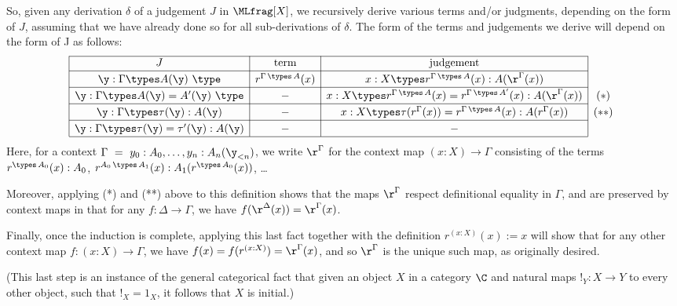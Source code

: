 So, given any derivation $\delta$ of a judgement $J$ in $\MLfrag[X]$, we recursively derive various terms and/or judgments, depending on the form of $J$, assuming that we have already done so for all sub-derivations of $\delta$.  The form of the terms and judgements we derive will depend on the form of J as follows:\medskip
\[\begin{array}{|c|c|c|c}
\cline{1-3} \rule[-1ex]{0ex}{3.1ex}
J & \textrm{term} & \textrm{judgement} & \\ 

\cline{1-3}  \rule[-1ex]{0ex}{3.5ex} 
\y:\Gamma \types A(\y)\ \type & r^{\Gamma \,\types\, A}(x) & x:X \types r^{\Gamma \,\types\, A}(x) : A(\r^\Gamma (x)) & \\ 

\cline{1-3}  \rule[-1ex]{0ex}{3.5ex} 
\y:\Gamma \types A(\y) = A'(\y) \ \type & - & x:X \types r^{\Gamma \,\types\, A}(x) = r^{\Gamma \,\types\, A'}(x) : A(\r^\Gamma (x)) & (*) \\

\cline{1-3}  \rule[-1ex]{0ex}{3.5ex} 
\y:\Gamma \types \tau(\y) : A(\y) & - & x:X \types \tau(r^\Gamma (x)) = r^{\Gamma \,\types\, A} (x) : A(r^\Gamma (x)) & (**) \\ 

\cline{1-3}  \rule[-1ex]{0ex}{3.5ex} 
\y:\Gamma \types \tau(\y) = \tau'(\y) : A(\y) & - & - & \\ 

\cline{1-3} \end{array}\]\medskip
Here, for a context $\Gamma\ =\ y_0:A_0, \ldots, y_n : A_n(\y_{< n})$, we write $\r^\Gamma$ for the context map $(x:X) \to \Gamma$ consisting of the terms $r^{\types\,A_0}(x) : A_0$, $r^{A_0\, \types\, A_1}(x) : A_1(r^{\types\,A_0}(x))$, \ldots %

Moreover, applying (*) and (**) above to this definition shows that the maps $\r^\Gamma$ respect definitional equality in $\Gamma$, and are preserved by context maps in that for any $f \colon \Delta \to \Gamma$, we have $f(\r^\Delta (x)) = \r^\Gamma (x)$.

Finally, once the induction is complete, applying this last fact together with the definition $r^{(x:X)}(x) := x$ will show that for any other context map $f \colon (x:X) \to \Gamma$, we have $f(x) = f(r^{(x:X)}) = \r^\Gamma (x)$, and so $\r^\Gamma$ is the unique such map, as originally desired.

(This last step is an instance of the general categorical fact that given an object $X$ in a category $\C$ and natural maps $!_Y \colon X \to Y$ to every other object, such that $!_X = 1_X$, it follows that $X$ is initial.)


